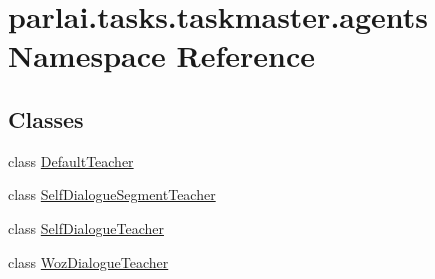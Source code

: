 \hypertarget{namespaceparlai_1_1tasks_1_1taskmaster_1_1agents}{}\section{parlai.\+tasks.\+taskmaster.\+agents Namespace Reference}
\label{namespaceparlai_1_1tasks_1_1taskmaster_1_1agents}
\subsection*{Classes}
\begin{DoxyCompactItemize}
\item 
class \hyperlink{classparlai_1_1tasks_1_1taskmaster_1_1agents_1_1DefaultTeacher}{Default\+Teacher}
\item 
class \hyperlink{classparlai_1_1tasks_1_1taskmaster_1_1agents_1_1SelfDialogueSegmentTeacher}{Self\+Dialogue\+Segment\+Teacher}
\item 
class \hyperlink{classparlai_1_1tasks_1_1taskmaster_1_1agents_1_1SelfDialogueTeacher}{Self\+Dialogue\+Teacher}
\item 
class \hyperlink{classparlai_1_1tasks_1_1taskmaster_1_1agents_1_1WozDialogueTeacher}{Woz\+Dialogue\+Teacher}
\end{DoxyCompactItemize}
